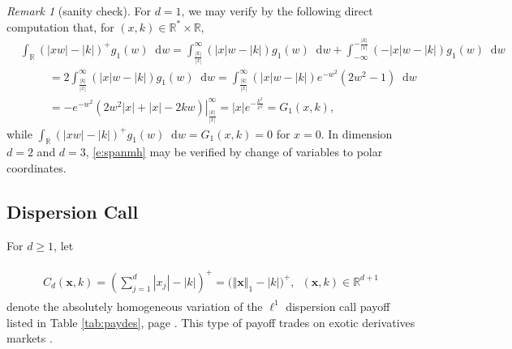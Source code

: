 \documentclass[11pt,A4,twoside]{article}
\numberwithin{equation}{section}
\renewcommand{\vec}{\mathbf}
\renewcommand*\d{\mathop{}\!\mathrm{d}}
\newcommand{\norm}[1]{\left|#1 \right|}
\newcommand{\Norm}[1]{\left\Vert#1 \right\Vert}
\newcommand{\x}{\mathbf{x}}
\newcommand{\R}{\mathbbm{R}}
\def\qqq{\;\;\;\;\;\;\;\;\;}
\newcommand{\beqa}{\begin{eqnarray}}
\newcommand{\eeqa}{\end{eqnarray}}
\def\bal{\begin{aligned}}
\def\eal{\end{aligned}}
\def\bll#1{
\beqa\label{#1}\bal
}\def\lel{\eal\eeqa}
\newcommand{\beql}[1]{\bll{#1}}
\newcommand{\eeql}{\lel}
\theoremstyle{definition}
\theoremstyle{remark}
\newtheorem{remark}{Remark}[section]
\def\sp{,\;}
\def\R{\mathbb{R}}
\def\finenv{\rule{4pt}{6pt}} \def\finenv{}
\begin{document}
\begin{remark}[sanity check]
    For $d=1$, we may verify by the following direct computation that, for $(x,k) \in  \R^{*}\times \R $,
\begin{align*}
     &\int_{\R} (|xw| -|k|)^+ g_1(w) \d w  =\int_{\frac{|k|}{|x|}}^\infty (|x|w -|k|) g_1(w) \d w + \int^{-\frac{|k|}{|x|}}_{-\infty} (-|x|w -|k|) g_1(w) \d w \\
     &\qqq= 2\int_{\frac{|k|}{|x|}}^\infty (|x|w -|k|) g_1(w) \d w
     = \int_{\frac{|k|}{|x|}}^\infty (|x|w -|k|) e^{-{w^2}}(2w^2-1) \d w \\
    &\qqq= \left.-e^{-w^2}(2w^2|x|+|x|-2kw)\right|^\infty_{\frac{|k|}{|x|}} = |x|e^{-\frac{k^2}{x^2}} = G_1(x,k),
\end{align*}
while $\int_{\R} (|xw| -|k|)^+ g_1(w) \d w = G_1(x, k) = 0$ for $x=0$.
In dimension $d=2$ and $d=3$, \eqref{e:spanmh} may be verified by change of variables to polar coordinates.\ \finenv
\end{remark}
 
 
\subsection{Dispersion Call\label{ss:dp}}

For $d \geq 1$,
let 
\beql{e:dcd}
C_d (\vec x, k)= \left( \sum_{j=1}^d \norm{x_j} - \norm k \right)^+
= \big(\Norm\x_1 - \norm k\big)^+\sp\  (\x,k) \in \R^{d+1 }
\eeql 
denote the absolutely homogeneous variation of the $\ell^1$ dispersion call payoff listed in Table \ref{tab:paydes}, page \pageref{tab:paydes}.  This type of payoff trades on exotic derivatives markets \citep*[Figure 1]{bossu-carr-papanicolaou:2022}.
 
\end{document}
